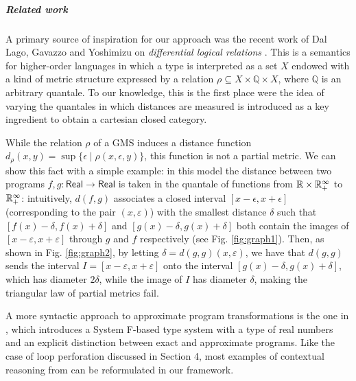 \subparagraph*{Related work}


A primary source of inspiration for our approach was the recent work of Dal Lago, Gavazzo and Yoshimizu on  \emph{differential logical relations} \cite{dallago:differential-stlc}. This is a semantics for higher-order languages in which a type is interpreted as a set $X$ endowed with a kind of metric structure expressed by a relation $\rho \subseteq X\times \mathbb Q\times X$, where $\mathbb Q$ is an arbitrary quantale. To our knowledge, this is the first place were the idea of varying the quantales in which distances are measured is introduced as a key ingredient to obtain a cartesian closed category.

While the relation $\rho$ of a GMS induces a distance function $d_{\rho}(x,y)=\sup\{\epsilon\mid \rho(x,\epsilon,y)\}$, this function is not a partial metric. We can show this fact with a simple example: in this model the distance between two programs 
 $f,g:\mathsf{Real}\to \mathsf{Real}$ is taken in the quantale of functions from $\mathbb{R}\times \mathbb{R}_{+}^{\infty}$ to $\mathbb{R}_{+}^{\infty}$: intuitively, 
  $d(f,g)$ associates a closed interval $[x-\epsilon,x+\epsilon]$ (corresponding to the pair $(x,\varepsilon)$) with the smallest distance $\delta$ such that $[ f(x)-\delta, f(x)+\delta]$ and $[g(x)-\delta,g(x)+\delta]$ both contain the images of $[x-\varepsilon, x+\varepsilon]$ through
 $g$ and $f$ respectively (see Fig. \ref{fig:graph1}). Then, as shown in Fig. \ref{fig:graph2}, by letting $\delta=d(g,g)(x,\varepsilon)$, we have that $d(g,g)$ sends the interval $I=[x-\varepsilon, x+\varepsilon]$ onto the interval $[g(x)-\delta, g(x)+\delta]$, which has diameter $2\delta$, while the image of $I$ has diameter $\delta$, making the triangular law of partial metrics fail. 



A more syntactic approach to approximate program transformations is the one in 
\cite{chaudhuri}, which introduces a System F-based type system with a type of real numbers and an explicit distinction between exact and approximate programs.
Like the case of loop perforation discussed in Section 4, most examples of contextual reasoning from \cite{chaudhuri} can be  reformulated in our framework. 




